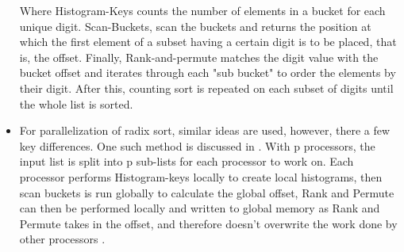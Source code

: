 \documentclass{article}
\begin{document}
\begin{itemize}
Where Histogram-Keys counts the number of elements in a bucket for each unique digit. Scan-Buckets, scan the buckets and returns the position at which the first element of a subset having a certain digit is to be placed, that is, the offset. Finally, Rank-and-permute matches the digit value with the bucket offset and iterates through each "sub bucket" to order the elements by their digit. After this, counting sort is repeated on each subset of digits until the whole list is sorted.  
\item For parallelization of radix sort, similar ideas are used, however, there a few key differences. One such method is discussed in \citep{zagharadixvector}. With p processors, the input list is split into p sub-lists for each processor to work on. Each processor performs Histogram-keys locally to create local histograms, then scan buckets is run globally to calculate the global offset, Rank and Permute can then be performed locally and written to global memory as Rank and Permute takes in the offset, and therefore doesn't overwrite the work done by other processors \citep{zagharadixvector}.


\end{itemize}
\end{document}
